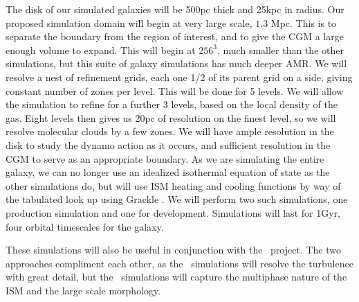 The disk of our simulated galaxies will be 500pc thick and 25kpc in radius.  Our
proposed simulation domain will begin at very large scale, $1.3$ Mpc.  This is to
separate the boundary from the region of interest, and to give the CGM a large
enough volume to expand.  This will begin at $256^3$, much smaller than the
other simulations, but this suite of galaxy simulations has much deeper AMR.  We will resolve a nest of refinement grids, each one
1/2 of its parent grid on a side, giving constant number of zones per level.
This will be done for 5 levels.  We will allow the simulation to 
refine for a further 3 levels, based on the local density of the gas.  Eight
levels then gives us 20pc of resolution on the finest
level, so we will resolve molecular clouds by a few zones.  We will have ample
resolution in the disk to study the dynamo action as it occurs, and sufficient
resolution in the CGM to serve as an appropriate boundary.  As we are simulating
the entire galaxy, we can no longer use an idealized isothermal equation of
state as the other simulations do, but will use ISM heating and cooling functions by way of the
tabulated look up using Grackle \citep{Smith17}.  We will perform two such
simulations, one production simulation and one for development.
Simulations will last for 1Gyr, four orbital timescales for the galaxy.  

These simulations will also be useful in conjunction with the \nameCMB\ project.
The two approaches compliment each other, as the \nameCMB\ simulations will
resolve the turbulence with great detail, but the \nameGalaxies\ simulations
will capture the multiphase nature of the ISM and the large scale morphology.
